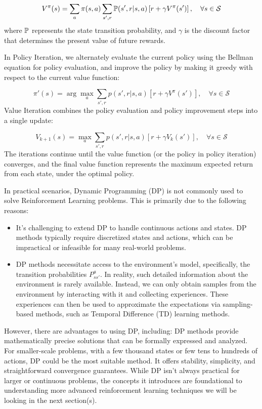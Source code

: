 \begin{equation}
V^\pi(s) = \sum_{a} \pi(s,a) \sum_{s',r} \mathbb P(s',r|s,a) \left[r + \gamma V^\pi(s')\right], \quad \forall s \in \mathcal{S}
\end{equation}
where $\mathbb P$ represents the state transition probability, and $\gamma$ is the discount factor that determines the present value of future rewards.

In Policy Iteration, we alternately evaluate the current policy using the Bellman equation for policy evaluation, and improve the policy by making it greedy with respect to the current value function:

\begin{equation}
\pi'(s) = \arg \max_{a} \sum_{s',r} p(s',r|s,a) \left[r + \gamma V^\pi(s')\right], \quad \forall s \in \mathcal{S}
\end{equation}
Value Iteration combines the policy evaluation and policy improvement steps into a single update:

\begin{equation}
V_{k+1}(s) = \max_{a} \sum_{s',r} p(s',r|s,a) \left[r + \gamma V_{k}(s')\right], \quad \forall s \in \mathcal{S}
\end{equation}
The iterations continue until the value function (or the policy in policy iteration) converges, and the final value function represents the maximum expected return from each state, under the optimal policy.

In practical scenarios, Dynamic Programming (DP) is not commonly used to solve Reinforcement Learning problems. This is primarily due to the following reasons:
\begin{itemize}
    \item It's challenging to extend DP to handle continuous actions and states. DP methods typically require discretized states and actions, which can be impractical or infeasible for many real-world problems.
    \item DP methods necessitate access to the environment's model, specifically, the transition probabilities $P_{ss'}^a$. In reality, such detailed information about the environment is rarely available. Instead, we can only obtain samples from the environment by interacting with it and collecting experiences. These experiences can then be used to approximate the expectations via sampling-based methods, such as Temporal Difference (TD) learning methods.
\end{itemize}
However, there are advantages to using DP, including: DP methods provide mathematically precise solutions that can be formally expressed and analyzed. For smaller-scale problems, with a few thousand states or few tens to hundreds of actions, DP could be the most suitable method. It offers stability, simplicity, and straightforward convergence guarantees.
While DP isn't always practical for larger or continuous problems, the concepts it introduces are foundational to understanding more advanced reinforcement learning techniques we will be looking in the next section(s).

